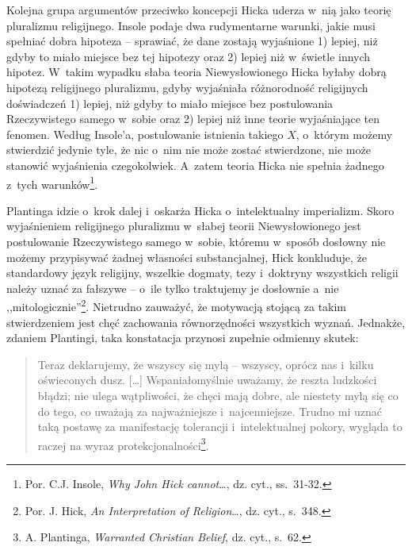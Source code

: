 Kolejna grupa argumentów przeciwko koncepcji Hicka uderza w~nią jako teorię pluralizmu religijnego. Insole podaje dwa rudymentarne warunki, jakie musi spełniać dobra hipoteza -- sprawiać, że dane zostają wyjaśnione 1) lepiej, niż gdyby to miało miejsce bez tej hipotezy oraz 2) lepiej niż w~świetle innych hipotez. W~takim wypadku słaba teoria Niewysłowionego Hicka byłaby dobrą hipotezą religijnego pluralizmu, gdyby wyjaśniała różnorodność religijnych doświadczeń 1) lepiej, niż gdyby to miało miejsce bez postulowania Rzeczywistego samego w~sobie oraz 2) lepiej niż inne teorie wyjaśniające ten fenomen. Według Insole'a, postulowanie istnienia takiego $X$, o~którym możemy stwierdzić jedynie tyle, że nic o~nim nie może zostać stwierdzone, nie może stanowić wyjaśnienia czegokolwiek. A~zatem teoria Hicka nie spełnia żadnego z~tych warunków\footnote{Por. C.J. Insole, \textit{Why John Hick cannot}\ldots, dz. cyt., ss.~31-32.}.

Plantinga idzie o~krok dalej i~oskarża Hicka o~intelektualny imperializm. Skoro wyjaśnieniem religijnego pluralizmu w~słabej teorii Niewysłowionego jest postulowanie Rzeczywistego samego w~sobie, któremu w~sposób dosłowny nie możemy przypisywać żadnej własności substancjalnej, Hick konkluduje, że standardowy język religijny, wszelkie dogmaty, tezy i~doktryny wszystkich religii należy uznać za fałszywe -- o~ile tylko traktujemy je dosłownie a~nie ,,mitologicznie''\footnote{Por. J. Hick, \textit{An Interpretation of Religion}\ldots, dz. cyt., s.~348.}. Nietrudno zauważyć, że motywacją stojącą za takim stwierdzeniem jest chęć zachowania równorzędności wszystkich wyznań. Jednakże, zdaniem Plantingi, taka konstatacja przynosi zupełnie odmienny skutek:

\begin{quote}
Teraz deklarujemy, że wszyscy się mylą -- wszyscy, oprócz nas i~kilku oświeconych dusz. [\ldots] Wspaniałomyślnie uważamy, że reszta ludzkości błądzi; nie ulega wątpliwości, że chęci mają dobre, ale niestety mylą się co do tego, co uważają za najważniejsze i~najcenniejsze. Trudno mi uznać taką postawę za manifestację tolerancji i~intelektualnej pokory, wygląda to raczej na wyraz protekcjonalności\footnote{A. Plantinga, \textit{Warranted Christian Belief}, dz. cyt., s.~62.}.
\end{quote}

